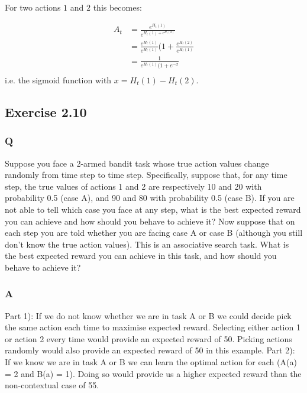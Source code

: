 For two actions \(1\) and \(2\) this becomes:

\begin{align}
	A_t  &= \frac{e^{H_t(1)}}{e^{H_t(1) + e^{H_t(2)}}}  \\
	&= \frac{e^{H_t(1)}}{e^{H_t(1)}}{(1 + \frac{e^{H_t(2)}}{e^{H_t(1)}}}  \\
	&= \frac{1}{e^{H_t(1)}(1 + e^{-x}}  \\
\end{align}
i.e. the sigmoid function with $x = H_t(1) - H_t(2)$.

\subsection{Exercise 2.10}
\subsubsection*{Q}
Suppose you face a 2-armed bandit task whose true action values change randomly from time step to time step. Specifically, suppose that, for any time step, the true values of actions 1 and 2 are respectively 10 and 20 with probability 0.5 (case A), and 90 and 80 with probability 0.5 (case B). If you are not able to tell which case you face at any step, what is the best expected reward you can achieve and how should you behave to achieve it? Now suppose that on each step you are told whether you are facing case A or case B (although you still don’t know the true action values). This is an associative search task. What is the best expected reward you can achieve in this task, and how should you behave to achieve it?

\subsubsection*{A}
Part 1): If we do not know whether we are in task A or B we could decide pick the same action each time to maximise expected reward. Selecting either action 1 or action 2 every time would provide an expected reward of 50. Picking actions randomly would also provide an expected reward of 50 in this example.
Part 2): If we know we are in task A or B we can learn the optimal action for each (A(a) = 2 and B(a) = 1). Doing so would provide us a higher expected reward than the non-contextual case of 55.